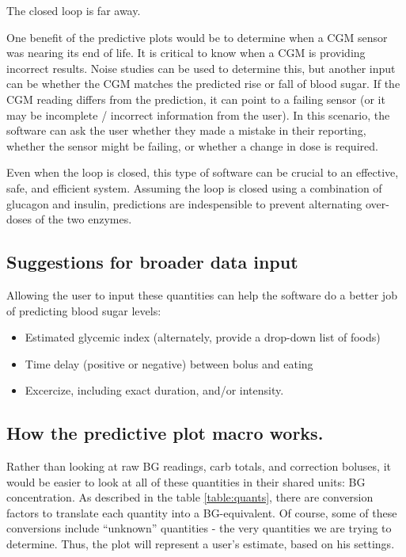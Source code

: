 The closed loop is far away.

One benefit of the predictive plots would be to determine when a CGM sensor was nearing its end of
life. It is critical to know when a CGM is providing incorrect results. Noise studies can be used to
determine this, but another input can be whether the CGM matches the predicted rise or fall of blood
sugar. If the CGM reading differs from the prediction, it can point to a failing sensor (or it may
be incomplete / incorrect information from the user). In this scenario, the software can ask the user
whether they made a mistake in their reporting, whether the sensor might be failing, or whether a
change in dose is required.

Even when the loop is closed, this type of software can be crucial to an effective, safe, and efficient
system. Assuming the loop is closed using a combination of glucagon and insulin, predictions are
indespensible to prevent alternating over-doses of the two enzymes.

\subsection{Suggestions for broader data input}

Allowing the user to input these quantities can help the software do a better job of predicting blood
sugar levels:

\begin{itemize}
  \item Estimated glycemic index (alternately, provide a drop-down list of foods)
  \item Time delay (positive or negative) between bolus and eating
  \item Excercize, including exact duration, and/or intensity.
\end{itemize}

\subsection{How the predictive plot macro works.} 

Rather than looking at raw BG readings, carb totals, and correction boluses, it would be easier to 
look at all of these quantities in their shared units: BG concentration. As described in the table 
\ref{table:quants}, there are conversion factors to translate each quantity into a BG-equivalent. 
Of course, some of these conversions include ``unknown'' quantities - the very quantities we are 
trying to determine. Thus, the plot will represent a user's estimate, based on his settings.

